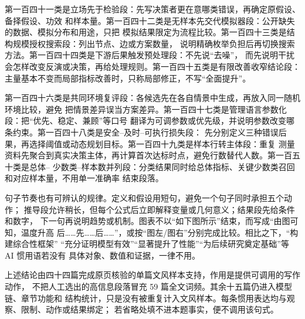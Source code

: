 第一百四十一类是立场先于检验段：先写决策者更在意哪类错误，再确定原假设、备择假设、功效
和样本量。第一百四十二类是无样本先交代模拟器段：公开缺失的数据、模拟分布和用途，只把
模拟结果限定为流程比较。第一百四十三类是结构规模授权搜索段：列出节点、边或方案数量，
说明精确枚举负担后再切换搜索方法。第一百四十四类是下游后果触发预处理段：不先说“去噪”，
而先说明干扰会怎样改变反演或决策，再给处理规则。第一百四十五类是有限改善收窄结论段：
主量基本不变而局部指标改善时，只称局部修正，不写“全面提升”。

第一百四十六类是共同环境复评段：各候选先在各自情景中生成，再放入同一随机环境比较，避免
把情景差异误当方案差异。第一百四十七类是管理语言参数化段：把“优先、稳定、兼顾”等口号
翻译为可调参数或优先级，并说明参数改变哪条约束。第一百四十八类是安全--及时--可执行损失段：
先分别定义三种错误后果，再选择阈值或动态规划目标。第一百四十九类是样本行转主体段：重复
测量资料先聚合到真实决策主体，再计算首次达标时点，避免行数替代人数。第一百五十类是总体--
少数类--样本数并列段：分类结果同时给总体指标、关键少数类召回和对应样本量，不用单一准确率
结束段落。

句子节奏也有可辨认的规律。定义和假设用短句，避免一个句子同时承担五个动作；
推导段允许稍长，但每个公式后立即解释变量或几何意义；结果段先给条件和数字，
下一句再说明趋势或机制。图表不以“如下图所示”结束，而写成“由图可知，温度升高
后……先……后……”，或按“图左/图右”分别完成比较。相比之下，“构建综合性框架”
“充分证明模型有效”“显著提升了性能”“为后续研究奠定基础”等 AI 惯用语若没有
具体对象、数值和证据，一律不用。

上述结论由四十四篇完成原页核验的单篇文风样本支持，作用是提供可调用的写作动作，
不把人工选出的高信息段落冒充 59 篇全文词频。其余十五篇仍进入模型链、章节功能和
结构统计，只是没有被重复计入文风样本。每条惯用表达均与观察、限制、动作或结果绑定；
若省略处填不进本题事实，便不调用该句式。

